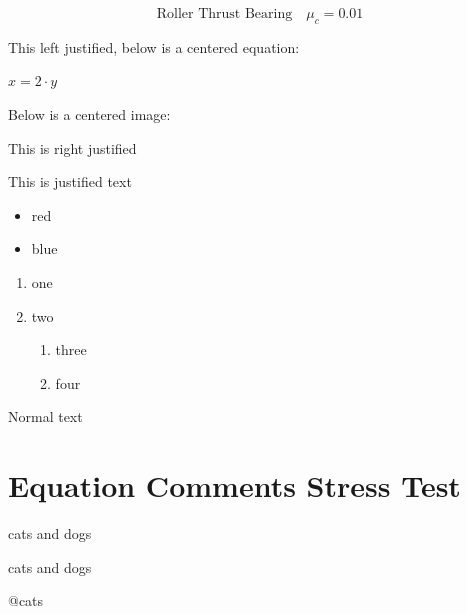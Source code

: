 \documentclass[
  letterpaper,
]{article}
\providecommand{\tightlist}{%
  \setlength{\itemsep}{0pt}\setlength{\parskip}{0pt}}
\begin{document}
\[ \text{Roller Thrust Bearing} \quad \mu_{c} = 0.01 \]

This left justified, below is a centered equation:

\begin{center}

\(x=2\cdot y\)

\end{center}

Below is a centered image:

\begin{center}

\end{center}

\begin{flushright}

This is right justified

\end{flushright}

This is justified text

\begin{itemize}
\tightlist
\item
  red
\item
  blue
\end{itemize}

\begin{enumerate}
\def\labelenumi{\arabic{enumi}.}
\tightlist
\item
  one
\item
  two

  \begin{enumerate}
  \def\labelenumii{\alph{enumii}.}
  \tightlist
  \item
    three
  \item
    four
  \end{enumerate}
\end{enumerate}

Normal text

\section{Equation Comments Stress
Test}\label{equation-comments-stress-test}

cats and dogs

cats and dogs

@cats
\end{document}
